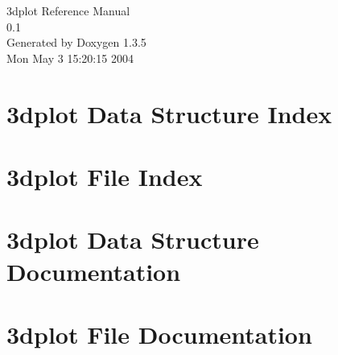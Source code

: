 \documentclass[a4paper]{book}
\begin{document}
\begin{titlepage}
\vspace*{7cm}
\begin{center}
{\Large 3dplot Reference Manual\\[1ex]\large 0.1 }\\
\vspace*{1cm}
{\large Generated by Doxygen 1.3.5}\\
\vspace*{0.5cm}
{\small Mon May 3 15:20:15 2004}\\
\end{center}
\end{titlepage}
\clearemptydoublepage
{}
\tableofcontents
\clearemptydoublepage
{}
\chapter{3dplot Data Structure Index}

\chapter{3dplot File Index}

\chapter{3dplot Data Structure Documentation}




\chapter{3dplot File Documentation}











\printindex
\end{document}
